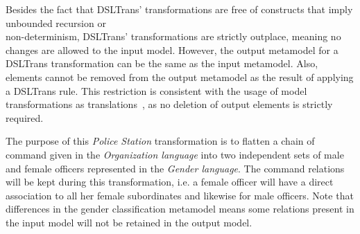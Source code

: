 Besides the fact that DSLTrans' transformations are free of constructs that
imply unbounded recursion or \\non-determinism, DSLTrans' transformations are strictly outplace, meaning no changes are allowed to the input model. However, the output metamodel for a DSLTrans transformation can
be the same as the input metamodel. Also, elements cannot be removed
from the output metamodel as the result of applying a DSLTrans rule.
This restriction is consistent with the usage of model transformations as
translations~\cite{AMT2012}, as no deletion of output elements is strictly required.

The purpose of this \emph{Police Station} transformation is to flatten a chain of command given
in the \emph{Organization language} into two independent sets of male
and female officers represented in the \emph{Gender language}. The command
relations will be kept during this transformation, i.e. a female officer will
have a direct association to all her female subordinates and likewise for male
officers. Note that differences in the gender classification metamodel means
some relations present in the input model will not be retained in the output
model.

